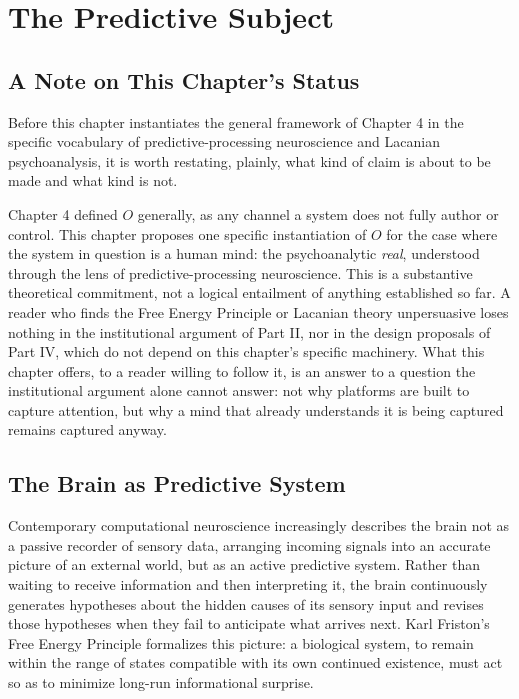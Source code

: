 \documentclass[12pt,a4paper]{book}
\begin{document}
\chapter{The Predictive Subject}

\section{A Note on This Chapter's Status}

Before this chapter instantiates the general framework of Chapter 4 in the specific vocabulary of predictive-processing neuroscience and Lacanian psychoanalysis, it is worth restating, plainly, what kind of claim is about to be made and what kind is not.

Chapter 4 defined $O$ generally, as any channel a system does not fully author or control. This chapter proposes one specific instantiation of $O$ for the case where the system in question is a human mind: the psychoanalytic \emph{real}, understood through the lens of predictive-processing neuroscience. This is a substantive theoretical commitment, not a logical entailment of anything established so far. A reader who finds the Free Energy Principle or Lacanian theory unpersuasive loses nothing in the institutional argument of Part II, nor in the design proposals of Part IV, which do not depend on this chapter's specific machinery. What this chapter offers, to a reader willing to follow it, is an answer to a question the institutional argument alone cannot answer: not why platforms are built to capture attention, but why a mind that already understands it is being captured remains captured anyway.

\section{The Brain as Predictive System}

Contemporary computational neuroscience increasingly describes the brain not as a passive recorder of sensory data, arranging incoming signals into an accurate picture of an external world, but as an active predictive system. Rather than waiting to receive information and then interpreting it, the brain continuously generates hypotheses about the hidden causes of its sensory input and revises those hypotheses when they fail to anticipate what arrives next. Karl Friston's Free Energy Principle formalizes this picture: a biological system, to remain within the range of states compatible with its own continued existence, must act so as to minimize long-run informational surprise.
\end{document}
